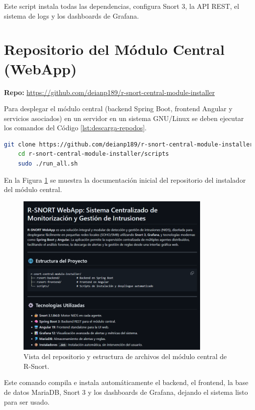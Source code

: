 \documentclass[11pt,a4paper,twoside]{report}
\begin{document}
Este script instala todas las dependencias, configura Snort 3, la API REST, el sistema de logs y los dashboards de Grafana.

\section{Repositorio del Módulo Central (WebApp)}

\textbf{Repo:} \url{https://github.com/deianp189/r-snort-central-module-installer}

Para desplegar el módulo central (backend Spring Boot, frontend Angular y servicios asociados) en un servidor en un sistema GNU/Linux se deben ejecutar los comandos del Código \ref{lst:descarga-repodos}.

\begin{lstlisting}[language=bash, caption={Descarga del repositorio de r-snort-central-module-installer.}, label={lst:descarga-repodos}]
	git clone https://github.com/deianp189/r-snort-central-module-installer.git
	cd r-snort-central-module-installer/scripts
	sudo ./run_all.sh
\end{lstlisting}

En la Figura \ref{fig:docu-dos} se muestra la documentación inicial del repositorio del instalador del módulo central.

\begin{figure}[H]
	\centering
	\includegraphics[width=0.85\textwidth]{apendix_web/1.png}
	\caption{Vista del repositorio y estructura de archivos del módulo central de R-Snort.}
	\label{fig:docu-dos}
\end{figure}

Este comando compila e instala automáticamente el backend, el frontend, la base de datos MariaDB, Snort 3 y los dashboards de Grafana, dejando el sistema listo para ser usado.
\end{document}
